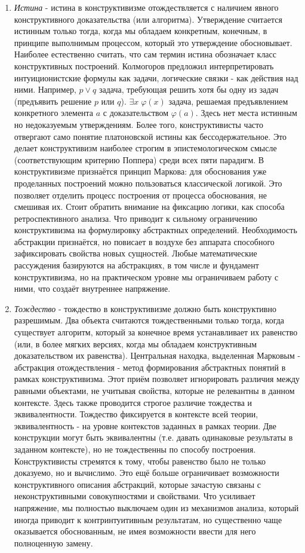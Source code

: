 \documentclass[12pt]{article}
\begin{document}
\begin{enumerate}
    \item {\it Истина} - истина в конструктивизме отождествляется с наличием явного конструктивного доказательства (или алгоритма). Утверждение считается истинным только тогда, когда мы обладаем конкретным, конечным, в принципе выполнимым процессом, который это утверждение обосновывает. Наиболее естественно считать, что сам термин истина обозначает класс конструктивных построений. Колмогоров предложил интерпретировать интуиционистские формулы как задачи, логические связки - как действия над ними. Например, $p \vee q$ задача, требующая решить хотя бы одну из задач (предъявить решение $p$ или $q$). $\exists x \; \varphi(x)$ задача, решаемая предъявлением конкретного элемента $a$ с доказательством $\varphi(a)$. Здесь нет места истинным но недоказуемым утверждениям. Более того, конструктивисты часто отвергают само понятие платоновской истины как бессодержательное. Это делает конструктивизм наиболее строгим в эпистемологическом смысле (соответствующим критерию Поппера) среди всех пяти парадигм. В конструктивизме признаётся принцип Маркова: для обоснования уже проделанных построений можно пользоваться классической логикой. Это позволяет отделить процесс построения от процесса обоснования, не смешивая их. Стоит обратить внимание на фиксацию логики, как способа ретроспективного анализа. Что приводит к сильному ограничению конструктивизма на формулировку абстрактных определений. Необходимость абстракции признаётся, но повисает в воздухе без аппарата способного зафиксировать свойства новых сущностей. Любые математические рассуждения базируются на абстракциях, в том числе и фундамент конструктивизма, но на практическом уровне мы ограничиваем работу с ними, что создаёт внутреннее напряжение. 
    \item {\it Тождество} - тождество в конструктивизме должно быть конструктивно разрешимым. Два объекта считаются тождественными только тогда, когда существует алгоритм, который за конечное время устанавливает их равенство (или, в более мягких версиях, когда мы обладаем конструктивным доказательством их равенства). Центральная находка, выделенная Марковым - абстракция отождествления - метод формирования абстрактных понятий в рамках конструктивизма. Этот приём позволяет игнорировать различия между равными объектами, не учитывая свойства, которые не релевантны в данном контексте. Здесь также проводится строгое различие тождества и эквивалентности. Тождество фиксируется в контексте всей теории, эквивалентность - на уровне контекстов заданных в рамках теории. Две конструкции могут быть эквивалентны (т.е. давать одинаковые результаты в заданном контексте), но не тождественны по способу построения. Конструктивисты стремятся к тому, чтобы равенство было не только доказуемо, но и вычислимо. Это ещё больше ограничивает возможности конструктивного описания абстракций, которые зачастую связаны с неконструктивными совокупностями и свойствами. Что усиливает напряжение, мы полностью выключаем один из механизмов анализа, который иногда приводит к контринтуитивным результатам, но существенно чаще оказывается обоснованным, не имея возможности ввести для него полноценную замену.

\end{enumerate}
\end{document}

